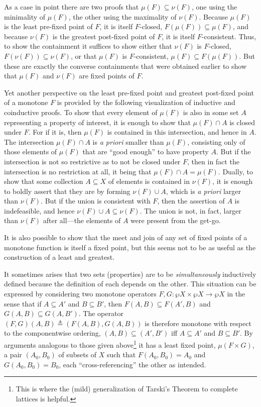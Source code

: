\documentclass[11pt,twoside]{article}
\newcommand{\eqdef}{\mathrel{\triangleq}}
\begin{document}
As a case in point there are two proofs that $\mu(F)\subseteq\nu(F)$, one using the minimality of
$\mu(F)$, the other using the maximality of $\nu(F)$.  Because $\mu(F)$ is the least pre-fixed
point of $F$, it is itself $F$-closed, $F(\mu(F))\subseteq\mu(F)$, and because $\nu(F)$ is the greatest
post-fixed point of $F$, it is itself $F$-consistent.  Thus, to show the containment it
suffices to show either that $\nu(F)$ is $F$-closed, $F(\nu(F))\subseteq\nu(F)$, or that
$\mu(F)$ is $F$-consistent, $\mu(F)\subseteq F(\mu(F))$.  But these are exactly the converse
containments that were obtained earlier to show that $\mu(F)$ and $\nu(F)$ are fixed points of
$F$.

\smallskip

Yet another perspective on the least pre-fixed point and greatest post-fixed point of a
monotone $F$ is provided by the following visualization of inductive and coinductive
proofs.  To show that every element of $\mu(F)$ is also in some set $A$ representing a
property of interest, it is enough to show that $\mu(F)\cap A$ is closed under $F$.  For if it
is, then $\mu(F)$ is contained in this intersection, and hence in $A$.  The intersection
$\mu(F)\cap A$ is \emph{a priori} smaller than $\mu(F)$, consisting only of those elements of
$\mu(F)$ that are ``good enough'' to have property $A$.  But if the intersection is not so
restrictive as to not be closed under $F$, then in fact the intersection is no restriction
at all, it being that $\mu(F)\cap A=\mu(F)$.  Dually, to show that some collection
$A\subseteq X$ of elements is contained in $\nu(F)$, it is enough to boldly assert that they are by
forming $\nu(F)\cup A$, which is \emph{a priori} larger than $\nu(F)$.  But if the union is
consistent with $F$, then the assertion of $A$ is indefeasible, and hence
$\nu(F)\cup A\subseteq\nu(F)$.  The union is not, in fact, larger than $\nu(F)$ after all---the elements of
$A$ were present from the get-go.

\smallskip

It is also possible to show that the meet and join of any set of fixed points of a
monotone function is itself a fixed point, but this seems not to be as useful as the
construction of a least and greatest.

\smallskip

It sometimes arises that two sets (properties) are to be \emph{simultaneously} inductively
defined because the definition of each depends on the other.  This situation can be
expressed by considering two monotone operators $F, G : \wp{X}\times\wp{X}\to\wp{X}$ in the sense that
if $A\subseteq A'$ and $B\subseteq B'$, then $F(A,B)\subseteq F(A',B)$ and
$G(A,B)\subseteq G(A,B')$.  The operator $(F,G)(A,B)\eqdef (F(A,B),G(A,B))$ is therefore monotone
with respect to the componentwise ordering, $(A,B)\subseteq (A',B')$ iff $A\subseteq A'$ and
$B\subseteq B'$.  By arguments analogous to those given above\footnote{This is where the (mild)
  generalization of Tarski's Theorem to complete lattices is helpful.} it has a least
fixed point, $\mu(F\times G)$, a pair $(A_{0},B_{0})$ of subsets of $X$ such that
$F(A_{0},B_{0})=A_{0}$ and $G(A_{0},B_{0})=B_{0}$, each ``cross-referencing'' the other as
intended.
\end{document}
